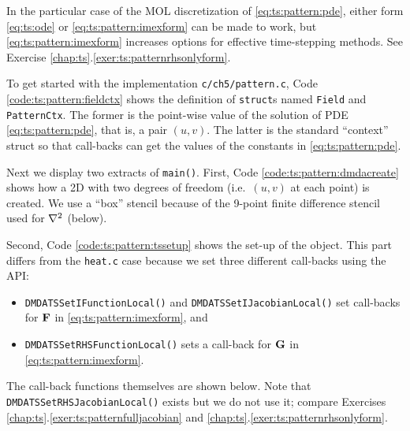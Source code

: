 In the particular case of the MOL discretization of \eqref{eq:ts:pattern:pde}, either form \eqref{eq:ts:ode} or \eqref{eq:ts:pattern:imexform} can be made to work, but \eqref{eq:ts:pattern:imexform} increases options for effective time-stepping methods.  See Exercise \ref{chap:ts}.\ref{exer:ts:patternrhsonlyform}.


To get started with the implementation \texttt{c/ch5/pattern.c}, Code \ref{code:ts:pattern:fieldctx} shows the definition of \texttt{struct}s named \texttt{Field} and \texttt{PatternCtx}.  The former is the point-wise value of the solution of PDE \eqref{eq:ts:pattern:pde}, that is, a pair $(u,v)$.  The latter is the standard ``context'' struct so that call-backs can get the values of the constants in \eqref{eq:ts:pattern:pde}.


Next we display two extracts of \texttt{main()}.  First, Code \ref{code:ts:pattern:dmdacreate} shows how a 2D \pDMDA with two degrees of freedom (i.e.~$(u,v)$ at each point) is created.  We use a ``box'' stencil because of the 9-point finite difference stencil used for $\nabla^2$ (below).


Second, Code \ref{code:ts:pattern:tssetup} shows the set-up of the \pTS object.  This part differs from the \texttt{heat.c} case because we set three different call-backs using the \PETSc API:
\begin{itemize}
\item \texttt{DMDATSSetIFunctionLocal()} and \texttt{DMDATSSetIJacobianLocal()} set call-backs for $\mathbf{F}$ in \eqref{eq:ts:pattern:imexform}, and
\item \texttt{DMDATSSetRHSFunctionLocal()} sets a call-back for $\mathbf{G}$ in \eqref{eq:ts:pattern:imexform}.
\end{itemize}
The call-back functions themselves are shown below.  Note that \texttt{DMDATSSetRHSJacobianLocal()} exists but we do not use it; compare Exercises \ref{chap:ts}.\ref{exer:ts:patternfulljacobian} and \ref{chap:ts}.\ref{exer:ts:patternrhsonlyform}.

